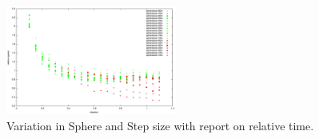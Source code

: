 \documentclass[twoside,twocolumn,11pt]{article} %
\begin{document}
\begin{figure}
	\includegraphics[width=0.5\textwidth]{figures/SphereAndStepAll.pdf}
	\caption{Variation in Sphere and Step size with report on relative time.}
	\label{fig:SphereStepInfl}
\end{figure}




\end{document}
